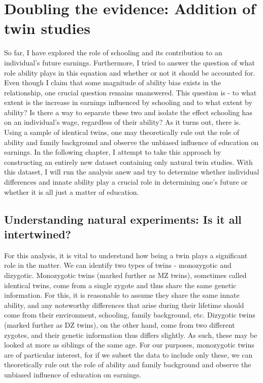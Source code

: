 \chapter{Doubling the evidence: Addition of twin studies}
\label{chap:seven}

So far, I have explored the role of schooling and its contribution to an individual's future earnings. Furthermore, I tried to answer the question of what role ability plays in this equation and whether or not it should be accounted for.
Even though I claim that some magnitude of ability bias exists in the relationship, one crucial question remains unanswered. This question is - to what extent is the increase in earnings influenced by schooling and to what extent by ability? Is there a way to separate these two and isolate the effect schooling has on an individual's wage, regardless of their ability? As it turns out, there is. Using a sample of identical twins, one may theoretically rule out the role of ability and family background and observe the unbiased influence of education on earnings. In the following chapter, I attempt to take this approach by constructing an entirely new dataset containing only natural twin studies. With this dataset, I will run the analysis anew and try to determine whether individual differences and innate ability play a crucial role in determining one's future or whether it is all just a matter of education.


\section{Understanding natural experiments: Is it all intertwined?}
\label{sec:twins_literature}

For this analysis, it is vital to understand how being a twin plays a significant role in the matter. We can identify two types of twins - monozygotic and dizygotic. Monozygotic twins (marked further as MZ twins), sometimes called identical twins, come from a single zygote and thus share the same genetic information. For this, it is reasonable to assume they share the same innate ability, and any noteworthy differences that arise during their lifetime should come from their environment, schooling, family background, etc. Dizygotic twins (marked further as DZ twins), on the other hand, come from two different zygotes, and their genetic information thus differs slightly. As such, these may be looked at more as siblings of the same age. For our purposes, monozygotic twins are of particular interest, for if we subset the data to include only these, we can theoretically rule out the role of ability and family background and observe the unbiased influence of education on earnings.

